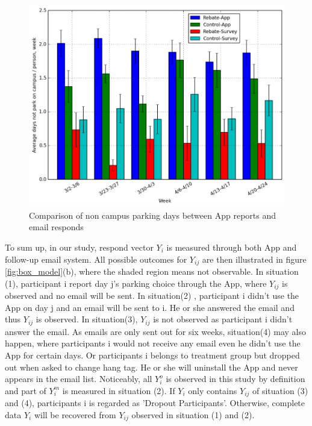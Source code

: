 \documentclass[preprint,12pt]{elsarticle}
\begin{document}
\begin{figure}[!htb]
\centering
\includegraphics[scale=0.4]{AverageParkingBarPlot.png}
\caption{Comparison of non campus parking days between App reports and email responds }
\label{fig:AverageParkingBarPlot}
\end{figure}
 

To sum up, in our study, respond vector $Y_i$ is measured through both App and follow-up email system. All possible outcomes for $Y_{ij}$ are then illustrated in figure \ref{fig:box_model}(b), where the shaded region means not observable. In situation (1), participant i report day j's parking choice through the App, where $Y_{ij}$ is observed and no email will be sent. In situation(2) , participant i didn't use the App on day j and an email will be sent to i. He or she answered the email and thus $Y_{ij}$ is observed. In situation(3), $Y_{ij}$ is not observed as participant i didn't answer the email. As emails are only sent out for six weeks, situation(4) may also happen, where participants i would not receive any email even he didn't use the App for certain days. Or participants i belongs to treatment group but dropped out when asked to change hang tag. He or she will uninstall the App and never appears in the email list. Noticeably, all $Y^o_i$ is observed in this study by definition and part of $Y^m_i$ is measured in situation (2). If $Y_i$ only contains $Y_{ij}$ of situation (3) and (4), participants i is regarded as 'Dropout Participants'. Otherwise, complete data $Y_i$ will be recovered from $Y_{ij}$ observed in situation (1) and (2).\\
\end{document}
